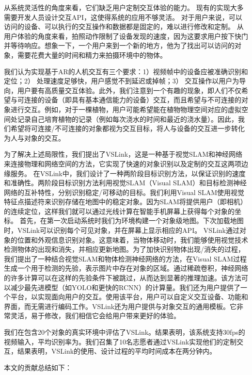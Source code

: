 从系统灵活性的角度来看，它们缺乏用户定制交互体验的能力。
现有的实现大多需要开发人员设计交互API，这使得系统的应用不够灵活。
对于用户来说，可以访问的设备、可以执行的交互操作和数据都是固定的，难以进行修改和定制。
从用户体验的角度来看，拍照动作限制了设备发现的速度，因为这要求用户按下快门并等待响应。想象一下，一个用户来到一个新的地方，他为了找出可以访问的对象，需要花费大量的时间和精力来拍摄环境中的物体。

我们认为实现基于AR的人机交互有三个要求：1）视频帧中的设备应被准确识别和定位；2） 处理速度足够快，用户感觉不到延迟或掉帧；3） 交互操作以用户为导向，用户要有高质量交互体验。此外，我们注意到一个有趣的现象，即人们不仅希望与可连接的设备（即具有基本通信能力的设备）交互，而且希望与不可连接的对象进行交互。例如，对于一棵植物，用户可能希望能在植物物理空间对应的虚拟空间处记录自己培育植物的记录（例如每次浇水的时间和最近的浇水量）。因此，我们希望将可连接/不可连接的对象都视为交互目标，将人与设备的交互进一步转化为人与对象的交互。

为了解决上述局限性，我们提出了VSLink，这是一种基于视觉SLAM和神经网络来连接物理和网络空间的方法，它实现了快速的对象识别以及定制的交互这两项边缘服务。
在VSLink中，我们设计了一种两阶段目标识别方法，以保证识别的速度和准确性。两阶段目标识别方法利用视觉SLAM（Visual SLAM）和目标检测神经网络的互补特性，分别识别稳定/可移动的目标。我们利用Visual SLAM使用视觉特征点描述符来识别存储在地图中的稳定对象。因为SLAM将提供用户（即相机）的连续定位，这样我们就可以通过光线计算在智能手机屏幕上获得每个对象的坐标。
首先，在第一次启动系统时我们为环境构建一个对象级地图。下次加载地图时，VSLink可以识别每个可见对象，并在屏幕上显示相应的API。
VSLink通过对象的位置和外观信息识别对象。这意味着，当物体移动时，我们能够使用视觉技术检测物体的出现和消失，并相应更新地图。为了加快识别物体出现/消失的过程，我们提出了一种结合视觉SLAM和物体检测神经网络的方法，在Visual SLAM过程生成一个用于检测的先验，表示图片中存在对象的区域。通过稀疏卷积\cite{ren2018sbnet}，神经网络的许多计算可以在这样的先验条件下被跳过，从而达到显著的推理加速。该方法可以减少最先进模型（如YOLO和更快的RCNN）的计算量。我们还为用户提供了一个平台，以实现面向用户的交互。使用该平台，用户可以自定义交互设备、功能和界面，而无需进行编码工作。VSLink还为用户提供与对象交互的通用模板。它非常灵活，易于修改，我们相信它会给用户带来更好的体验。

我们在包含20个对象的真实环境中评估了VSLink。结果表明，该系统支持30fps的视频输入，平均识别率为{\acc}。我们召集了10名志愿者通过VSLink实现他们的定制交互，结果表明，VSLink的使用、设计过程的平均时间成本在两分钟内。

本文的贡献总结如下：

